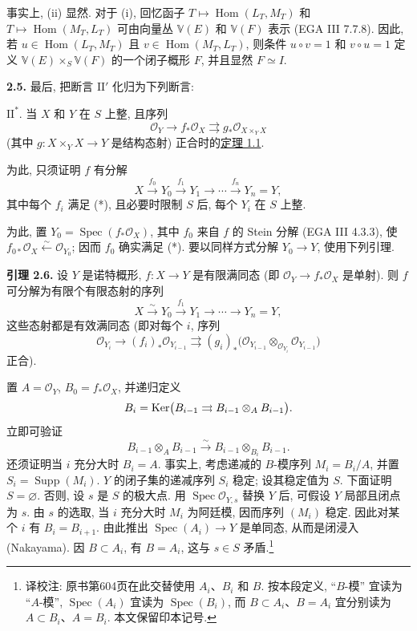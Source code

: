 事实上, (ii) 显然. 对于 (i), 回忆函子 $T\mapsto\operatorname{Hom}(L_T,M_T)$ 和 $T\mapsto\operatorname{Hom}(M_T,L_T)$ 可由向量丛 $\mathbb V(E)$ 和 $\mathbb V(F)$ 表示 (EGA III 7.7.8). 因此, 若 $u\in\operatorname{Hom}(L_T,M_T)$ 且 $v\in\operatorname{Hom}(M_T,L_T)$, 则条件 $u\circ v=1$ 和 $v\circ u=1$ 定义 $\mathbb V(E)\times_S\mathbb V(F)$ 的一个闭子概形 $F$, 并且显然 $F\simeq I$.

\textbf{2.5.} 最后, 把断言 $\mathrm{II}'$ 化归为下列断言:

\medskip
\noindent
$\mathrm{II}^*$. 当 $X$ 和 $Y$ 在 $S$ 上整, 且序列
\begin{equation}\tag{*}
  \mathcal O_Y\longrightarrow f_*\mathcal O_X
  \rightrightarrows g_*\mathcal O_{X\times_YX}
\end{equation}
(其中 $g:X\times_YX\to Y$ 是结构态射) 正合时的\hyperlink{sga6.e12.thm.1-1}{定理 1.1}.
\medskip

为此, 只须证明 $f$ 有分解
\[
  X\xrightarrow{f_0}Y_0\xrightarrow{f_1}Y_1
  \longrightarrow\cdots\xrightarrow{f_n}Y_n=Y,
\]
其中每个 $f_i$ 满足 (*), 且必要时限制 $S$ 后, 每个 $Y_i$ 在 $S$ 上整.

为此, 置 $Y_0=\operatorname{Spec}(f_*\mathcal O_X)$, 其中 $f_0$ 来自 $f$ 的 Stein 分解 (EGA III 4.3.3), 使 $f_{0*}\mathcal O_X\xleftarrow{\sim}\mathcal O_{Y_0}$; 因而 $f_0$ 确实满足 (*). 要以同样方式分解 $Y_0\to Y$, 使用下列引理.

\textbf{引理 2.6.} 设 $Y$ 是诺特概形, $f:X\to Y$ 是有限满同态 (即 $\mathcal O_Y\to f_*\mathcal O_X$ 是单射). 则 $f$ 可分解为有限个有限态射的序列
\[
  X\xrightarrow{\sim}Y_0\xrightarrow{f_1}Y_1
  \longrightarrow\cdots\longrightarrow Y_n=Y,
\]
这些态射都是有效满同态 (即对每个 $i$, 序列
\[
  \mathcal O_{Y_i}\longrightarrow(f_i)_*\mathcal O_{Y_{i-1}}
  \rightrightarrows
  (g_i)_*\bigl(
    \mathcal O_{Y_{i-1}}\otimes_{\mathcal O_{Y_i}}
    \mathcal O_{Y_{i-1}}
  \bigr)
\]
正合).

置 $A=\mathcal O_Y$, $B_0=f_*\mathcal O_X$, 并递归定义
\[
  B_i=\operatorname{Ker}\bigl(
    B_{i-1}\rightrightarrows B_{i-1}\otimes_A B_{i-1}
  \bigr).
\]
立即可验证
\[
  B_{i-1}\otimes_A B_{i-1}
  \xrightarrow{\sim}
  B_{i-1}\otimes_{B_i}B_{i-1}.
\]
还须证明当 $i$ 充分大时 $B_i=A$. 事实上,
考虑递减的 $B$-模序列 $M_i=B_i/A$, 并置 $S_i=\operatorname{Supp}(M_i)$. $Y$ 的闭子集的递减序列 $S_i$ 稳定; 设其稳定值为 $S$. 下面证明 $S=\varnothing$. 否则, 设 $s$ 是 $S$ 的极大点. 用 $\operatorname{Spec}\mathcal O_{Y,s}$ 替换 $Y$ 后, 可假设 $Y$ 局部且闭点为 $s$. 由 $s$ 的选取, 当 $i$ 充分大时 $M_i$ 为阿廷模, 因而序列 $(M_i)$ 稳定. 因此对某个 $i$ 有 $B_i=B_{i+1}$. 由此推出 $\operatorname{Spec}(A_i)\to Y$ 是单同态, 从而是闭浸入 (Nakayama). 因 $B\subset A_i$, 有 $B=A_i$, 这与 $s\in S$ 矛盾.\footnote{译校注: 原书第604页在此交替使用 $A_i$、$B_i$ 和 $B$. 按本段定义, ``$B$-模'' 宜读为 ``$A$-模'', $\operatorname{Spec}(A_i)$ 宜读为 $\operatorname{Spec}(B_i)$, 而 $B\subset A_i$、$B=A_i$ 宜分别读为 $A\subset B_i$、$A=B_i$. 本文保留印本记号.}

